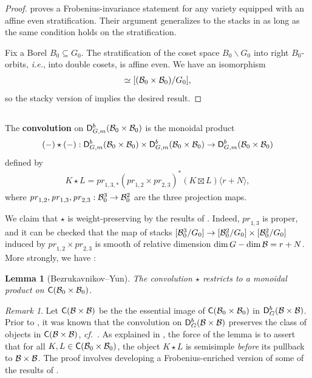 \documentclass[a4paper,10pt,leqno]{amsart}
\theoremstyle{plain}
\theoremstyle{plain}
\theoremstyle{plain}
\newtheorem{lem}[thm]{Lemma}
\theoremstyle{definition}
\theoremstyle{remark}
\newtheorem{rem}[thm]{Remark}
\newcommand{\dfemph}[1]{\textbf{#1}}
\renewcommand{\pr}{\mathit{pr}}
\begin{document}
\begin{proof}
\cite[Lem.\ 7.8]{ar} proves a Frobenius-invariance statement for any variety equipped with an affine even stratification.
Their argument generalizes to the stacks in \cite{sun} as long as the same condition holds on the stratification.

Fix a Borel $B_0 \subseteq G_0$.
The stratification of the coset space $B_0\backslash G_0$ into right $B_0$-orbits, \emph{i.e.}, into double cosets, is affine even.
We have an isomorphism 
\begin{align}
[B_0\backslash G_0/B_0] \simeq [(\cal{B}_0 \times \cal{B}_0)/G_0],
\end{align}
so the stacky version of \cite[Lem.\ 7.8]{ar} implies the desired result.
\end{proof}

\subsection{}

The \dfemph{convolution} on $\sf{D}_{G, m}^b(\cal{B}_0 \times \cal{B}_0)$ is the monoidal product
\begin{align}
(-) \star (-) : \sf{D}_{G, m}^b(\cal{B}_0 \times \cal{B}_0) \times \sf{D}_{G, m}^b(\cal{B}_0 \times \cal{B}_0) \to \sf{D}_{G, m}^b(\cal{B}_0 \times \cal{B}_0)
\end{align}
defined by
\begin{align}
K \star L = \pr_{1, 3, \ast}(\pr_{1, 2} \times \pr_{2, 3})^\ast (K \boxtimes L)\langle r + N\rangle,
\end{align}
where $\pr_{1, 2}, \pr_{1, 3}, \pr_{2, 3} : \cal{B}_0^3 \to \cal{B}_0^2$ are the three projection maps.

We claim that $\star$ is weight-preserving by the results of \cite{deligne_1980}.
Indeed, $\pr_{1, 3}$ is proper, and it can be checked that the map of stacks $[\cal{B}_0^3/G_0] \to [\cal{B}_0^2/G_0] \times [\cal{B}_0^2/G_0]$ induced by $\pr_{1, 2} \times \pr_{2, 3}$ is smooth of relative dimension $\dim G - \dim \cal{B} = r + N$.
More strongly, we have \cite[Prop.\ 3.2.5]{by}:

\begin{lem}[Bezrukavnikov--Yun]
The convolution $\star$ restricts to a monoidal product on $\sf{C}(\cal{B}_0 \times \cal{B}_0)$.
\end{lem}

\begin{rem}\label{rem:by}
Let $\sf{C}(\cal{B} \times \cal{B})$ be the the essential image of $\sf{C}(\cal{B}_0 \times \cal{B}_0)$ in $\sf{D}_G^b(\cal{B} \times \cal{B})$.
Prior to \cite{by}, it was known that the convolution on $\sf{D}_G^b(\cal{B} \times \cal{B})$ preserves the class of objects in $\sf{C}(\cal{B} \times \cal{B})$, \emph{cf.}\ \cite[Prop.\ 2.13]{springer_1982}. %
As explained in \cite[Rem.\ 3.2.6]{by}, the force of the lemma is to assert that for all $K, L \in \sf{C}(\cal{B}_0 \times \cal{B}_0)$, the object $K \star L$ is semisimple \emph{before} its pullback to $\cal{B} \times \cal{B}$.
The proof involves developing a Frobenius-enriched version of some of the results of \cite{springer_1982}.
\end{rem}
\end{document}
